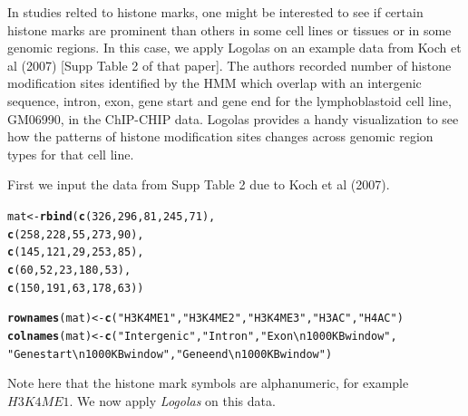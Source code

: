 \documentclass[12pt]{article}\usepackage[]{graphicx}\usepackage[usenames,dvipsnames]{color}
\makeatletter
\newcommand{\hlnum}[1]{\textcolor[rgb]{0.686,0.059,0.569}{#1}}%
\newcommand{\hlstr}[1]{\textcolor[rgb]{0.192,0.494,0.8}{#1}}%
\newcommand{\hlstd}[1]{\textcolor[rgb]{0.345,0.345,0.345}{#1}}%
\newcommand{\hlkwb}[1]{\textcolor[rgb]{0.69,0.353,0.396}{#1}}%
\newcommand{\hlkwd}[1]{\textcolor[rgb]{0.737,0.353,0.396}{\textbf{#1}}}%
\newenvironment{kframe}{%
 \def\at@end@of@kframe{}%
 \ifinner\ifhmode%
  \def\at@end@of@kframe{\end{minipage}}%
  \begin{minipage}{\columnwidth}%
 \fi\fi%
 \def\FrameCommand##1{\hskip\@totalleftmargin \hskip-\fboxsep
 \colorbox{shadecolor}{##1}\hskip-\fboxsep
     \hskip-\linewidth \hskip-\@totalleftmargin \hskip\columnwidth}%
 \MakeFramed {\advance\hsize-\width
   \@totalleftmargin\z@ \linewidth\hsize
   \@setminipage}}%
 {\par\unskip\endMakeFramed%
 \at@end@of@kframe}
\newenvironment{knitrout}{}{} %
\newcommand{\Logolas}{\textit{Logolas}}
\makeatother
\begin{document}
In studies relted to histone marks, one might be interested to see if certain histone marks are prominent than others in some cell lines or tissues or in some genomic regions. In this case, we apply Logolas on an example data from Koch et al (2007) [Supp Table 2 of that paper]. The authors recorded number of histone modification sites identified by the HMM which overlap with an intergenic sequence, intron, exon, gene start and gene end for the lymphoblastoid cell line, GM06990, in the ChIP-CHIP data. Logolas provides a handy visualization to see how the patterns of histone modification sites changes across genomic region types for that cell line.

First we input the data from Supp Table 2 due to Koch et al (2007).

\begin{knitrout}
\color{fgcolor}\begin{kframe}
\begin{alltt}
\hlstd{mat} \hlkwb{<-} \hlkwd{rbind}\hlstd{(}\hlkwd{c}\hlstd{(}\hlnum{326}\hlstd{,} \hlnum{296}\hlstd{,} \hlnum{81}\hlstd{,} \hlnum{245}\hlstd{,} \hlnum{71}\hlstd{),}
             \hlkwd{c}\hlstd{(}\hlnum{258}\hlstd{,} \hlnum{228}\hlstd{,} \hlnum{55}\hlstd{,} \hlnum{273}\hlstd{,} \hlnum{90}\hlstd{),}
             \hlkwd{c}\hlstd{(}\hlnum{145}\hlstd{,} \hlnum{121}\hlstd{,} \hlnum{29}\hlstd{,} \hlnum{253}\hlstd{,} \hlnum{85}\hlstd{),}
             \hlkwd{c}\hlstd{(}\hlnum{60}\hlstd{,} \hlnum{52}\hlstd{,} \hlnum{23}\hlstd{,} \hlnum{180}\hlstd{,} \hlnum{53}\hlstd{),}
             \hlkwd{c}\hlstd{(}\hlnum{150}\hlstd{,} \hlnum{191}\hlstd{,} \hlnum{63}\hlstd{,} \hlnum{178}\hlstd{,} \hlnum{63}\hlstd{))}

\hlkwd{rownames}\hlstd{(mat)} \hlkwb{<-} \hlkwd{c}\hlstd{(}\hlstr{"H3K4ME1"}\hlstd{,} \hlstr{"H3K4ME2"}\hlstd{,} \hlstr{"H3K4ME3"}\hlstd{,} \hlstr{"H3AC"}\hlstd{,} \hlstr{"H4AC"}\hlstd{)}
\hlkwd{colnames}\hlstd{(mat)} \hlkwb{<-} \hlkwd{c}\hlstd{(}\hlstr{"Intergenic"}\hlstd{,}\hlstr{"Intron"}\hlstd{,}\hlstr{"Exon \textbackslash{}n 1000 KB window"}\hlstd{,}
                   \hlstr{"Gene start \textbackslash{}n 1000 KB window"}\hlstd{,}\hlstr{"Gene end \textbackslash{}n 1000 KB window"}\hlstd{)}
\end{alltt}
\end{kframe}
\end{knitrout}

Note here that the histone mark symbols are alphanumeric, for example $H3K4ME1$.
We now apply \Logolas{} on this data.
\end{document}
